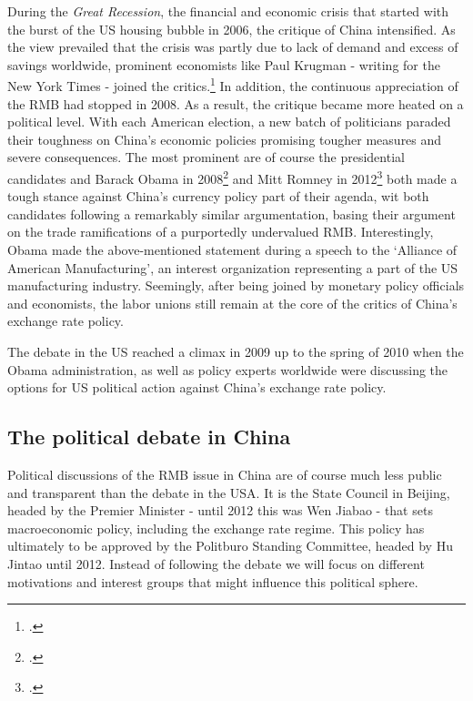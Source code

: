 During the \emph{Great Recession}, the financial and economic crisis that started with the burst of the US housing bubble in 2006, the critique of China intensified. As the view prevailed that the crisis was partly due to lack of demand and excess of savings worldwide, prominent economists like Paul Krugman - writing for the New York Times - joined the critics.\footnote{\cite{Krugman2009}.} In addition, the continuous appreciation of the RMB had stopped in 2008. As a result, the critique became more heated on a political level. With each American election, a new batch of politicians paraded their 
toughness on China's economic policies promising tougher measures and 
severe consequences. The most prominent are of course the presidential candidates and  Barack Obama in 
2008\footnote{\cite{Obama2008}.} and Mitt Romney in 2012\footnote{\cite{Romney2012}.} both made a tough stance against China's currency policy part of their agenda, wit both candidates following a remarkably similar argumentation, basing their argument on the trade ramifications of a 
purportedly undervalued RMB. Interestingly, Obama made the above-mentioned statement during a speech to the `Alliance of American 
Manufacturing', an interest organization representing a part of the US 
manufacturing industry. Seemingly, after being joined by monetary policy officials and economists, the labor unions still remain at the core of the critics of China's exchange rate policy.

The debate in the US reached a climax in 2009 up to the spring of 2010 
when the Obama administration, as well as policy experts worldwide were 
discussing the options for US political action against China's exchange 
rate policy.


\subsection{The political debate in China}


Political discussions of the RMB issue in China are of course much less public and 
transparent than the debate in the USA. It is the State Council in 
Beijing, headed by the Premier Minister - until 2012 this was Wen Jiabao 
- that sets macroeconomic policy, including the exchange rate regime.  
This policy has ultimately to be approved by the Politburo Standing 
Committee, headed by Hu Jintao until 2012. Instead of following the 
debate we will focus on different motivations and interest groups that 
might influence this political sphere.


